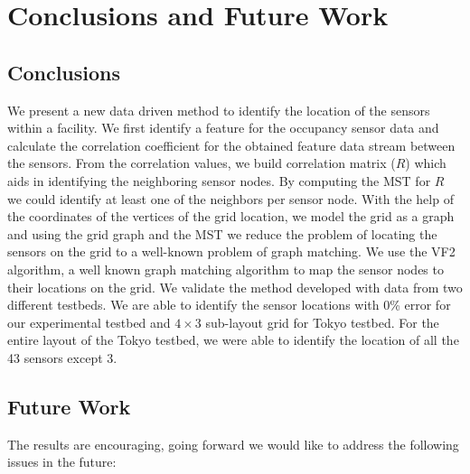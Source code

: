 \chapter{Conclusions and Future Work}
\label{chp:conclusionsandfuturework}

\section{Conclusions}
We present a new data driven method to identify the location of the sensors within a facility. We first identify a feature for the occupancy sensor data and calculate the correlation coefficient for the obtained feature data stream between the sensors. From the correlation values, we build correlation matrix ($R$)  which aids in identifying the neighboring sensor nodes. By computing the MST for $R$ we could identify at least one of the neighbors per sensor node. With the help of the coordinates of the vertices of the grid location, we model the grid as a graph and using the grid graph and the MST we reduce the problem of locating the sensors on the grid to a well-known problem of graph matching. We use the VF2 algorithm, a well known graph matching algorithm to map the sensor nodes to their locations on the grid. We validate the method developed with data from two different testbeds. We are able to identify the sensor locations with 0\% error for our experimental testbed and $4\times3$ sub-layout grid for Tokyo testbed. For the entire layout of the Tokyo testbed, we were able to identify the location of all the 43 sensors except 3.  


\section{Future Work}
The results are encouraging, going forward we would like to address the following issues in the future:

